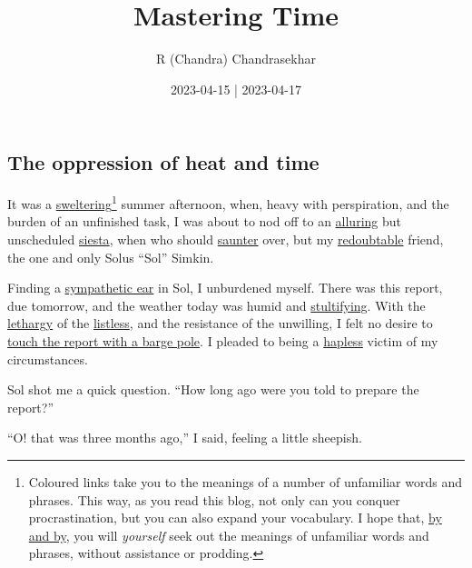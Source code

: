 \documentclass[
  a4paper,
]{article}
\title{Mastering Time}
\author{R (Chandra) Chandrasekhar}
\date{2023-04-15 | 2023-04-17}
\begin{document}
\maketitle

\thispagestyle{empty}


\hypertarget{the-oppression-of-heat-and-time}{%
\subsection{The oppression of heat and
time}\label{the-oppression-of-heat-and-time}}

It was a
\href{https://dictionary.cambridge.org/dictionary/english/sweltering}{sweltering}\footnote{Coloured
  links take you to the meanings of a number of unfamiliar words and
  phrases. This way, as you read this blog, not only can you conquer
  procrastination, but you can also expand your vocabulary. I hope that,
  \href{https://dictionary.cambridge.org/dictionary/english/by-and-by}{by
  and by}, you will \emph{yourself} seek out the meanings of unfamiliar
  words and phrases, without assistance or prodding.} summer afternoon,
when, heavy with perspiration, and the burden of an unfinished task, I
was about to nod off to an
\href{https://www.thefreedictionary.com/alluring}{alluring} but
unscheduled
\href{https://www.collinsdictionary.com/dictionary/english/siesta}{siesta},
when who should
\href{https://www.thefreedictionary.com/saunter}{saunter} over, but my
\href{https://www.vocabulary.com/dictionary/redoubtable}{redoubtable}
friend, the one and only Solus ``Sol'' Simkin.

Finding a
\href{https://www.macmillandictionary.com/dictionary/british/a-sympathetic-ear}{sympathetic
ear} in Sol, I unburdened myself. There was this report, due tomorrow,
and the weather today was humid and
\href{https://www.macmillandictionary.com/dictionary/british/stultifying}{stultifying}.
With the
\href{https://www.merriam-webster.com/dictionary/lethargy}{lethargy} of
the \href{https://www.thefreedictionary.com/listless}{listless}, and the
resistance of the unwilling, I felt no desire to
\href{https://idioms.thefreedictionary.com/I+wouldn\%27t+touch+with+a+barge+pole}{touch
the report with a barge pole}. I pleaded to being a
\href{https://www.dictionary.com/browse/hapless}{hapless} victim of my
circumstances.

Sol shot me a quick question. ``How long ago were you told to prepare
the report?''

``O! that was three months ago,'' I said, feeling a little sheepish.
\end{document}
